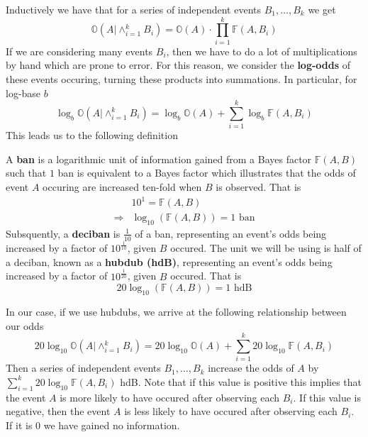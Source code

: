 \noindent Inductively we have that for a series of independent
events $B_1, \dots, B_k$ we get
\[
	\mathbb{O}(A|\wedge_{i=1}^k B_i) =
	\mathbb{O}(A)\cdot\prod_{i=1}^k{\mathbb{F}(A,B_i)}
\]
If we are considering many events $B_i$, then we have to do a lot
of multiplications by hand which are prone to error. For this
reason, we consider the {\bf{log-odds}} of these events occuring,
turning these products into summations. In particular, for log-base $b$
\[
	\log_b\mathbb{O}(A|\wedge_{i=1}^k B_i) =
	\log_b\mathbb{O}(A)+\sum_{i=1}^k{\log_b\mathbb{F}(A,B_i)}
\]
This leads us to the following definition
\begin{definition}
	A {\bf{ban}} is a logarithmic unit of information gained from a
	Bayes factor $\mathbb{F}(A,B)$ such that $1$ ban is equivalent to
	a Bayes factor which illustrates that the odds of event $A$
	occuring are increased ten-fold when $B$ is observed. That is
	\begin{align*}
		            & 10^1 = \mathbb{F}(A,B)                    \\
		\Rightarrow & \log_{10}(\mathbb{F}(A,B)) = 1\text{ ban}
	\end{align*}
	\noindent Subsquently, a {\bf{deciban}} is $\frac{1}{10}$ of a
	ban, representing an event's odds being increased by a factor of
	$10^\frac{1}{10}$, given $B$ occured. The unit we will be using
	is half of a deciban, known as a {\bf{hubdub (hdB)}},
	representing an event's odds being increased by a factor of
	$10^\frac{1}{20}$, given $B$ occured. That is
	\[
		20\log_{10}(\mathbb{F}(A,B)) = 1\text{ hdB}
	\]
\end{definition}
\noindent In our case, if we use hubdubs, we arrive at the
following relationship between our odds
\[
	20\log_{10}\mathbb{O}(A|\wedge_{i=1}^k B_i) =
	20\log_{10}\mathbb{O}(A)+\sum_{i=1}^k{20\log_{10}\mathbb{F}(A,B_i)}
\]
Then a series of independent events $B_1, \dots, B_k$ increase the
odds of $A$ by  $\sum_{i=1}^k{20\log_{10}\mathbb{F}(A,B_i)}$ hdB.
Note that if this value is positive this implies that the event $A$
is more likely to have occured after observing each $B_i$. If this
value is negative, then the event $A$ is less likely to have
occured after observing each $B_i$. If it is $0$ we have gained no
information.

